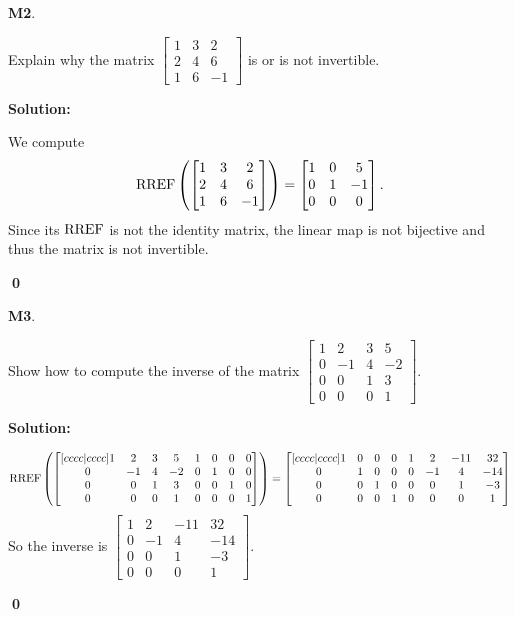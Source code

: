 \documentclass{article}
\newenvironment{problem}[1]
{
  \begin{flushleft}
  \textbf{#1}.
  \ignorespaces
}
{
  \end{flushleft}
}
\newenvironment{solution}
{
  \ignorespaces
  \textbf{Solution:}
}
{
  \ignorespacesafterend
  \begin{flushright}
  {\bfseries \qed}
  \end{flushright}
}
\begin{document}
\begin{problem}{M2}
Explain why the matrix \(\begin{bmatrix}1 & 3 & 2  \\ 2 & 4 & 6  \\ 1 & 6 & -1 \end{bmatrix}\) is or is not invertible.
\end{problem}
\begin{solution}
We compute
\[\operatorname{RREF}\left(\begin{bmatrix}1 & 3 & 2  \\ 2 & 4 & 6  \\ 1 & 6 & -1 \end{bmatrix}\right) = \begin{bmatrix} 1 & 0 & 5 \\ 0 & 1 & -1 \\ 0 & 0 & 0 \end{bmatrix}.\]
Since its \(\operatorname{RREF}\) is not the identity matrix, the linear map is not bijective and thus the matrix is not invertible.
\end{solution}

\begin{problem}{M3}
Show how to compute the inverse of the matrix
\(\begin{bmatrix}
1 & 2 & 3 & 5 \\ 0 & -1 & 4 & -2 \\ 0 & 0 & 1 & 3 \\ 0 & 0 & 0 & 1
\end{bmatrix}\).
\end{problem}
\begin{solution}
\[\operatorname{RREF}\left(\begin{bmatrix}[cccc|cccc] 1 & 2 & 3 & 5 & 1 & 0 & 0 & 0  \\ 0 & -1 & 4 & -2 & 0 & 1 & 0 & 0 \\ 0 & 0 & 1 & 3 & 0 & 0 & 1 & 0 \\ 0 & 0 & 0 & 1 & 0 & 0 & 0 & 1 \end{bmatrix}\right) = \begin{bmatrix}[cccc|cccc] 1 & 0 & 0 &0 & 1 & 2 & -11 & 32 \\ 0 & 1 & 0 & 0 & 0 & -1 & 4 & -14 \\ 0 & 0 & 1 & 0 & 0 & 0 & 1 & -3 \\ 0 & 0 & 0 & 1 & 0 & 0 & 0 & 1 \end{bmatrix}\]
So the inverse is \(\begin{bmatrix}  1 & 2 & -11 & 32 \\ 0 & -1 & 4 & -14 \\  0 & 0 & 1 & -3 \\ 0 & 0 & 0 & 1 \end{bmatrix}\).
\end{solution}
\end{document}
